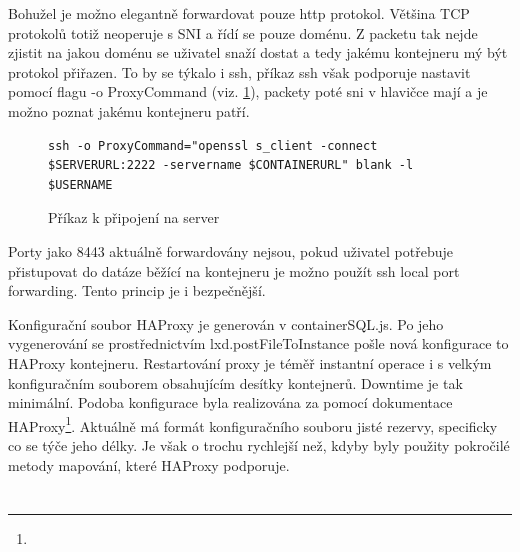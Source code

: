 \documentclass[a4paper,oneside,12pt]{report}
\let\openright=\clearpage
\begin{document}
Bohužel je možno elegantně forwardovat pouze http protokol.
Většina TCP protokolů totiž neoperuje s SNI a řídí se pouze doménu.
Z packetu tak nejde zjistit na jakou doménu se uživatel snaží dostat a tedy jakému kontejneru mý být protokol přiřazen.
To by se týkalo i ssh, příkaz ssh však podporuje nastavit pomocí flagu -o ProxyCommand (viz. \ref{fig:sshcom}), packety poté sni v hlavičce mají a je možno poznat jakému kontejneru patří.
\begin{figure}[h]
\begin{lstlisting}[breaklines]
ssh -o ProxyCommand="openssl s_client -connect $SERVERURL:2222 -servername $CONTAINERURL" blank -l $USERNAME
\end{lstlisting}
\caption[Příkaz k připojení na server, vlastní tvorba]{Příkaz k připojení na server\protect\footnotemark}
\label{fig:sshcom}
\end{figure}

Porty jako 8443 aktuálně forwardovány nejsou, pokud uživatel potřebuje přistupovat do datáze běžící na kontejneru je možno použít ssh local port forwarding.
Tento princip je i bezpečnější.

Konfigurační soubor HAProxy je generován v containerSQL.js.
Po jeho vygenerování se prostřednictvím lxd.postFileToInstance pošle nová konfigurace to HAProxy kontejneru.
Restartování proxy je téměř instantní operace i s velkým konfiguračním souborem obsahujícím desítky kontejnerů.
Downtime je tak minimální.
Podoba konfigurace byla realizována za pomocí dokumentace HAProxy\footnote{}.
Aktuálně má formát konfiguračního souboru jisté rezervy, specificky co se týče jeho délky.
Je však o trochu rychlejší než, kdyby byly použity pokročilé metody mapování, které HAProxy podporuje.




\chapter*{}
\setcounter{page}{6}




\listoffigures
\openright
\end{document}
